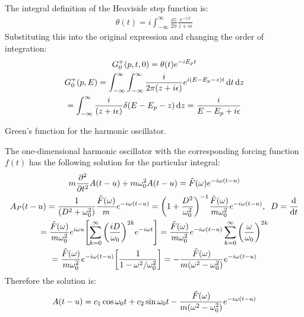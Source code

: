 \documentclass{report}
\begin{document}
\begin{subquests}
\begin{subquests}
		\item The integral definition of the Heaviside step function is:
		\begin{gather*}
			\theta(t) = i\int_{-\infty}^{\infty}\frac{\dd z}{2\pi}\frac{e^{-izt}}{z+i\epsilon}
		\end{gather*}
		Substituting this into the original expression and changing the order of integration:
		\begin{gather*}
			G^+_0(p,t,0) = \theta(t)e^{-iE_p t} \\
			G^+_0(p,E) = \int_{-\infty}^{\infty}\int_{-\infty}^{\infty}\frac{i}{2\pi\pqty{z+i\epsilon}}e^{i\pqty{E - E_p - z}t} \dd{t}\dd{z} \\
			= \int_{-\infty}^{\infty}\frac{i}{\pqty{z+i\epsilon}}\delta{\pqty{E - E_p - z}} \dd{z} = \frac{i}{E - E_p + i\epsilon}
		\end{gather*}
	\end{subquests}
	\newpage
	\item Green's function for the harmonic oscillator.
	\begin{subquests}
		\item The one-dimensional harmonic oscillator with the corresponding forcing function $f(t)$ has the following solution for the particular integral:
		\begin{gather*}
			m\pdv[2]{t}A(t-u) + m\omega_0^2A(t-u) = \tilde F(\omega)e^{-i\omega(t-u)} \\
			A_P(t-u) = \frac{1}{\pqty{D^2 + \omega_0^2}}\frac{\tilde F(\omega)}{m}e^{-i\omega(t-u)} = \pqty{1 + \frac{D^2}{\omega_0^2}}^{-1}\frac{\tilde F(\omega)}{m\omega_0^2}e^{-i\omega(t-u)},\;\; D = \dv{t} \\
			= \frac{\tilde F(\omega)}{m\omega_0^2}e^{i\omega u}\bqty{\sum_{k=0}^{\infty} \pqty{\frac{iD}{\omega_0}}^{2k}e^{-i\omega t}} = \frac{\tilde F(\omega)}{m\omega_0^2}e^{-i\omega(t-u)}\sum_{k=0}^{\infty}\pqty{\frac{\omega}{\omega_0}}^{2k}\\
			= \frac{\tilde F(\omega)}{m\omega_0^2}e^{-i\omega(t-u)}\bqty{\frac{1}{1-\omega^2/\omega_0^2}} = -\frac{\tilde F(\omega)}{m\pqty{\omega^2 - \omega_0^2}}e^{-i\omega(t-u)} 
		\end{gather*}
		Therefore the solution is:
		\begin{gather*}
			A(t-u) = c_1 \cos\omega_0 t + c_2 \sin\omega_0 t - \frac{\tilde F(\omega)}{m\pqty{\omega^2 - \omega_0^2}}e^{-i\omega(t-u)} 
		\end{gather*}


\end{subquests}
\end{subquests}
\end{document}
